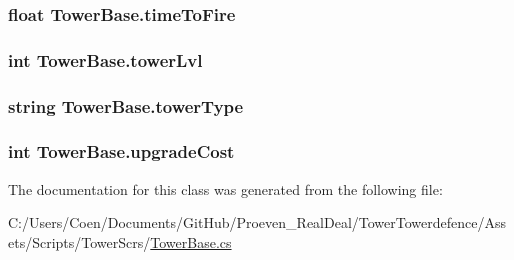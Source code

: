 \subsubsection[{\texorpdfstring{time\+To\+Fire}{timeToFire}}]{\setlength{\rightskip}{0pt plus 5cm}float Tower\+Base.\+time\+To\+Fire\hspace{0.3cm}{\ttfamily [protected]}}\hypertarget{class_tower_base_ae2afdd470131571a570c5610c2ff416b}{}\label{class_tower_base_ae2afdd470131571a570c5610c2ff416b}
\subsubsection[{\texorpdfstring{tower\+Lvl}{towerLvl}}]{\setlength{\rightskip}{0pt plus 5cm}int Tower\+Base.\+tower\+Lvl}\hypertarget{class_tower_base_acf978511d4a2929681acb1cae2201165}{}\label{class_tower_base_acf978511d4a2929681acb1cae2201165}
\subsubsection[{\texorpdfstring{tower\+Type}{towerType}}]{\setlength{\rightskip}{0pt plus 5cm}string Tower\+Base.\+tower\+Type}\hypertarget{class_tower_base_a3fa651023fb588b0af4289d2f26f365a}{}\label{class_tower_base_a3fa651023fb588b0af4289d2f26f365a}
\subsubsection[{\texorpdfstring{upgrade\+Cost}{upgradeCost}}]{\setlength{\rightskip}{0pt plus 5cm}int Tower\+Base.\+upgrade\+Cost}\hypertarget{class_tower_base_a267ec042fc28a481673c2d2b293b31d5}{}\label{class_tower_base_a267ec042fc28a481673c2d2b293b31d5}


The documentation for this class was generated from the following file\+:\begin{DoxyCompactItemize}
\item 
C\+:/\+Users/\+Coen/\+Documents/\+Git\+Hub/\+Proeven\+\_\+\+Real\+Deal/\+Tower\+Towerdefence/\+Assets/\+Scripts/\+Tower\+Scr\textquotesingle{}s/\hyperlink{_tower_base_8cs}{Tower\+Base.\+cs}\end{DoxyCompactItemize}
